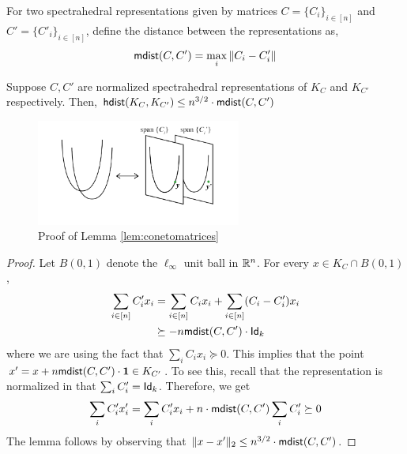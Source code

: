 For two spectrahedral representations given by matrices $ C = \{C_i\}_{i \in [n]} $ and $C' = \{C'_i\}_{i \in [n]}$, define the distance between the representations as,
\[ \mathsf{mdist}(C, C')  = \max_i \| C_i - C'_i \| \]

\begin{lemma} \label{lem:conetomatrices}
Suppose $C, C'$ are normalized spectrahedral representations of $K_C$ and $K_{C'}$ respectively.  Then,
$\mathsf{hdist}(K_C, K_{C'}) \leq n^{3/2} \cdot \mathsf{mdist}(C,C')$
\end{lemma}
\begin{figure}
	\centering
	\includegraphics[width=0.6\textwidth]{sections.PNG}
	\caption{Proof of Lemma \ref{lem:conetomatrices}}
\end{figure}

\begin{proof}
Let $B(0,1)$ denote the $\ell_\infty$ unit ball in $\mathbb{R}^n$.  For every $x \in K_C \cap B(0,1)$, 
\begin{align*}
 \sum_{i \in [n]} C'_i x_i & = \sum_{i \in [n]} C_i x_i + \sum_{i \in [n]} (C_i-C'_i) x_i \\
 & \succeq - n \mathsf{mdist}(C,C') \cdot \mathsf{Id}_k 
 \end{align*}
where we are using the fact that $\sum_i C_i x_i \succeq 0$.  This implies that the point $x' =  x + n \mathsf{mdist}(C,C') \cdot \mathbf{1} \in K_{C'}$.  To see this, recall that the representation is normalized in that $\sum_i C'_i = \mathsf{Id}_k$.  Therefore, we get 
\[ \sum_i C'_i x'_i = \sum_i C'_i x_i + n \cdot \mathsf{mdist}(C,C') \sum_i C'_i \succeq 0 \]
The lemma follows by observing that $\|x - x'\|_2 \leq n^{3/2} \cdot \mathsf{mdist}(C,C')$.

\end{proof}
